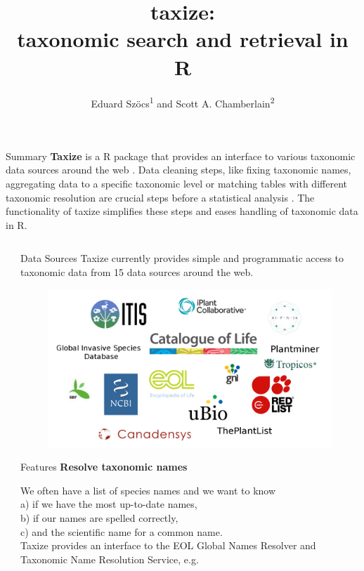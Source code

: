 \documentclass[final,t]{beamer}\usepackage[]{graphicx}\usepackage[]{color}
\title{taxize: \\[0.2em] taxonomic search and retrieval in R}
\author{Eduard Szöcs\textsuperscript{1} and Scott A. Chamberlain\textsuperscript{2}}
\institute{\textsuperscript{1}University of Koblenz-Landau, \textsuperscript{2}rOpenSci}
\begin{document}
  \begin{frame}[fragile]

		\begin{block}{\Large Summary}
    \Large \textcolor{i6bluedark}{\textbf{Taxize}} is a R package that provides an interface to various taxonomic data sources around the web \cite{chamberlain_taxize:_2013}.
    Data cleaning steps, like fixing taxonomic names, aggregating data to a specific taxonomic level or matching tables with different taxonomic resolution are crucial steps before a statistical analysis \cite{boyle_taxonomic_2013}. 
    The functionality of taxize simplifies these steps and eases handling of taxonomic data in R. 
    
		\end{block}

	\begin{columns}[t]
		\begin{column}{0.01\linewidth}
		\end{column}

		\begin{column}{.49\linewidth}
			\vspace{-\baselineskip}  %
			\begin{block}{Data Sources}
        Taxize currently provides simple and programmatic access to taxonomic data from 15 data sources around the web.
        \vspace{0.5cm}
				\begin{figure}
					\includegraphics[width=0.8\linewidth]{fig/sources.png}
					\label{fig:sources}
				\end{figure}
			\end{block}

			\begin{block}{Features}
				\textcolor{i6bluedark}{\textbf{\large Resolve taxonomic names}}
        \vspace{0.5em}
        \par
        \begingroup
        \leftskip=2cm
        \noindent 
          We often have a list of species names and we want to know \\
          a) if we have the most up-to-date names, \\
          b) if our names are spelled correctly,  \\
          c) and the scientific name for a common name.\\
          Taxize provides an interface to the EOL Global Names Resolver and Taxonomic Name Resolution Service, e.g.
        \par
        \endgroup


\end{block}
\end{column}
\end{columns}
\end{frame}
\end{document}
